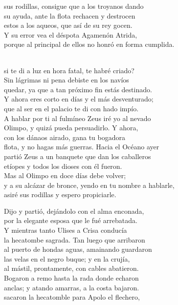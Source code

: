 sus rodillas, consigue que a los troyanos dando\\
su ayuda, ante la flota rechacen y destrocen\\
estos a los aqueos, que así de su rey gocen.\\
Y su error vea el déspota Agamenón Atrida,\\
porque al principal de ellos no honró en forma cumplida.\par
{}\\
si te di a luz en hora fatal, te habré criado?\\
Sin lágrimas ni pena debiste en los navíos\\
quedar, ya que a tan próximo fin estás destinado.\\
Y ahora eres corto en días y el más desventurado;\\
que al ser en el palacio te di con hado impío.\\
A hablar por ti al fulmíneo Zeus iré yo al nevado\\
Olimpo, y quizá pueda persuadirlo. Y ahora,\\
con los dánaos airado, gana tu bogadora\\
flota, y no hagas más guerras. Hacia el Océano ayer\\
partió Zeus a un banquete que dan los caballeros\\
etíopes y todos los dioses con él fueron.\\
Mas al Olimpo en doce días debe volver;\\
y a su alcázar de bronce, yendo en tu nombre a hablarle,\\
asiré sus rodillas y espero propiciarle.\par
Dijo y partió, dejándolo con el alma enconada,\\
por la elegante esposa que le fué arrebatada.\\
Y mientras tanto Ulises a Crisa conducía\\
la hecatombe sagrada. Tan luego que arribaron\\
al puerto de hondas aguas, amainando guardaron\\
las velas en el negro buque; y en la crujía,\\
al mástil, prontamente, con cables abatieron.\\
Bogaron a remo hasta la rada donde echaron\\
anclas; y atando amarras, a la costa bajaron.\\
sacaron la hecatomble para Apolo el flechero,\\
